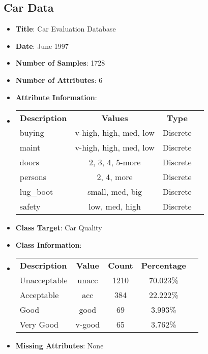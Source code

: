\documentclass[11pt,titlepage]{article}
\newcommand{\bb}{\textbf}
\begin{document}
\subsection{Car Data}
\begin{itemize}[leftmargin=*]
  \item[] \bb{Title}: Car Evaluation Database
  \item[] \bb{Date}: June 1997
  \item[] \bb{Number of Samples}: 1728
  \item[] \bb{Number of Attributes}: 6
  \item[] \bb{Attribute Information}:
  \item[]
  \begin{tabular}{l c c c }
    \bb{Description} & \bb{Values}            & \bb{Type} \\
    buying           & v-high, high, med, low & Discrete  \\
    maint            & v-high, high, med, low & Discrete  \\
    doors            & 2, 3, 4, 5-more        & Discrete  \\
    persons          & 2, 4, more             & Discrete  \\
    lug\_boot        & small, med, big        & Discrete  \\
    safety           & low, med, high         & Discrete
  \end{tabular}
  \item[] \bb{Class Target}: Car Quality
  \item[] \bb{Class Information}:
  \item[]
  \begin{tabular}{l c c c c }
    \bb{Description} & \bb{Value} & \bb{Count} & \bb{Percentage} \\
    Unacceptable     & unacc      & 1210       & 70.023\%        \\
    Acceptable       & acc        & 384        & 22.222\%        \\
    Good             & good       & 69         & 3.993\%         \\
    Very Good        & v-good     & 65         & 3.762\%
  \end{tabular}
  \item[] \bb{Missing Attributes}: None
\end{itemize}
\end{document}
